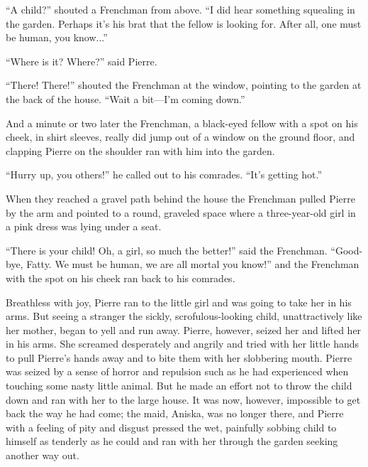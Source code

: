 ``A child?'' shouted a Frenchman from above. ``I did hear
something squealing in the garden. Perhaps it's his brat that the
fellow is looking for. After all, one must be human, you
know...''

``Where is it? Where?'' said Pierre.

``There! There!'' shouted the Frenchman at the window, pointing
to the garden at the back of the house. ``Wait a bit---I'm coming
down.''

And a minute or two later the Frenchman, a black-eyed fellow with
a spot on his cheek, in shirt sleeves, really did jump out of a
window on the ground floor, and clapping Pierre on the shoulder
ran with him into the garden.

``Hurry up, you others!'' he called out to his comrades. ``It's
getting hot.''

When they reached a gravel path behind the house the Frenchman
pulled Pierre by the arm and pointed to a round, graveled space
where a three-year-old girl in a pink dress was lying under a
seat.

``There is your child! Oh, a girl, so much the better!'' said the
Frenchman. ``Good-bye, Fatty. We must be human, we are all mortal
you know!'' and the Frenchman with the spot on his cheek ran back
to his comrades.

Breathless with joy, Pierre ran to the little girl and was going
to take her in his arms. But seeing a stranger the sickly,
scrofulous-looking child, unattractively like her mother, began
to yell and run away.  Pierre, however, seized her and lifted her
in his arms. She screamed desperately and angrily and tried with
her little hands to pull Pierre's hands away and to bite them
with her slobbering mouth. Pierre was seized by a sense of horror
and repulsion such as he had experienced when touching some nasty
little animal. But he made an effort not to throw the child down
and ran with her to the large house. It was now, however,
impossible to get back the way he had come; the maid, Aniska, was
no longer there, and Pierre with a feeling of pity and disgust
pressed the wet, painfully sobbing child to himself as tenderly
as he could and ran with her through the garden seeking another
way out.


